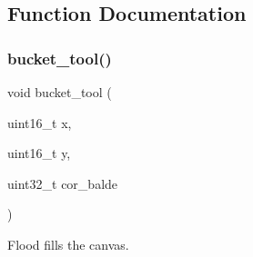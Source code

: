 \subsection{Function Documentation}
\mbox{\label{group__canvas_ga40081f7d018fdf95112d5171175fc30c}} 
\subsubsection{\texorpdfstring{bucket\+\_\+tool()}{bucket\_tool()}}
{\footnotesize\ttfamily void bucket\+\_\+tool (\begin{DoxyParamCaption}\item[{uint16\+\_\+t}]{x,  }\item[{uint16\+\_\+t}]{y,  }\item[{uint32\+\_\+t}]{cor\+\_\+balde }\end{DoxyParamCaption})}



Flood fills the canvas. 


